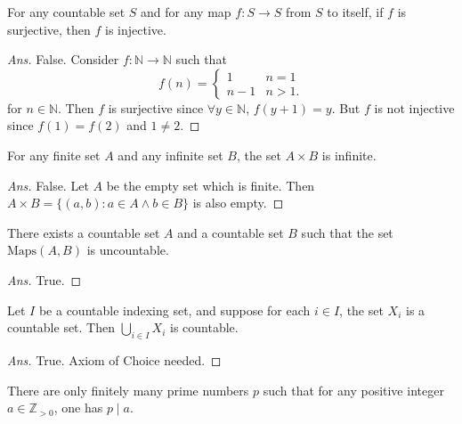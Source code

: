\documentclass[12pt]{article}
\newenvironment{problem}[2][Problem]{\begin{trivlist}
\item[\hskip \labelsep {\bfseries #1}\hskip \labelsep {\bfseries #2.}]}{\end{trivlist}}
\begin{document}
\begin{problem}{5}
For any countable set $S$ and for any map $f : S \rightarrow S$ from $S$ to itself, if $f$ is surjective, then $f$ is injective. 
\end{problem}

\begin{proof}[Ans]
False. Consider $f : \mathbb{N} \to \mathbb{N}$ such that
\[f(n) = \begin{cases}
    1 & n = 1 \\
    n - 1 & n > 1.
\end{cases}\]
for $n \in \mathbb{N}$. Then $f$ is surjective since $\forall y \in \mathbb{N}$, $f(y + 1) = y$. But $f$ is not injective since $f (1) = f(2)$ and $1 \neq 2$.
\end{proof}

\begin{problem}{6}
For any finite set $A$ and any infinite set $B$, the set $A \times B$ is infinite.
\end{problem}

\begin{proof}[Ans]
False. Let $A$ be the empty set which is finite. Then $A \times B = \{(a, b) : a \in A \land b \in B\}$ is also empty.

\end{proof}

\begin{problem}{7}
There exists a countable set $A$ and a countable set $B$ such that the set $\text{Maps}(A, B)$ is uncountable.
\end{problem}

\begin{proof}[Ans]
True.

\end{proof}

\begin{problem}{8}
Let $I$ be a countable indexing set, and suppose for each $i \in I$, the set $X_i$ is a countable set. Then $\bigcup_{i \in I} X_i$ is countable.
\end{problem}

\begin{proof}[Ans]
True. Axiom of Choice needed.
\end{proof}

\begin{problem}{9}
There are only finitely many prime numbers $p$ such that
for any positive integer $a \in \mathbb{Z}_{>0}$, one has $p \mid a$.
\end{problem}
\end{document}
